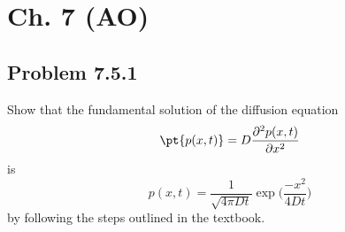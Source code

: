 \section{Ch. 7 (AO)}
\subsection{Problem 7.5.1}
Show that the fundamental solution of the diffusion equation
\begin{equation}
\pt{p(x,t)} = D \frac{\partial^2 p(x,t)}{\partial x^2} \label{eq:1d_diffusion}
\end{equation}
is
\begin{equation}
p(x,t) = \frac{1}{\sqrt{4 \pi D t}} \exp\bigg( \frac{- x^2}{4 D t}\bigg)
\end{equation}
by following the steps outlined in the textbook.

